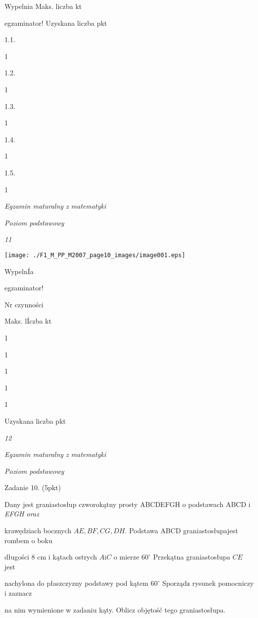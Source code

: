 \documentclass[a4paper,12pt]{article}
\begin{document}
Wypelnia Maks. liczba kt

egzaminator! Uzyskana liczba pkt

1.1.

1

1.2.

1

1.3.

1

1.4.

1

1.5.

1





{\it Egzamin maturalny z matematyki}

{\it Poziom podstawowy}

{\it 11}
\begin{center}
\texttt{[image: ./F1\_M\_PP\_M2007\_page10\_images/image001.eps]}
\end{center}
WypelnÍa

egzaminator!

Nr czynności

Maks. lÍczba kt

1

1

1

1

1

Uzyskana liczba pkt





{\it 12}

{\it Egzamin maturalny z matematyki}

{\it Poziom podstawowy}

Zadanie 10. (5pkt)

Dany jest graniastosłup czworokątny prosty ABCDEFGH o podstawach ABCD $\mathrm{i}$ {\it EFGH oraz}

krawędziach bocznych $AE, BF, CG, DH$. Podstawa ABCD graniastosłupajest rombem o boku

długości 8 cm i kątach ostrych $A \mathrm{i} C$ o mierze $60^{\circ}$ Przekątna graniastosłupa $CE$ jest

nachylona do płaszczyzny podstawy pod kątem $60^{\circ}$ Sporządz$\acute{}$ rysunek pomocniczy i zaznacz

na nim wymienione w zadaniu kąty. Oblicz objętość tego graniastosłupa.
\end{document}
